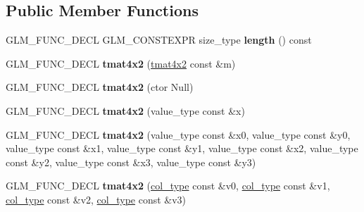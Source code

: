 \subsection*{Public Member Functions}
\begin{DoxyCompactItemize}
\item 
\hypertarget{structglm_1_1detail_1_1tmat4x2_a36f50e76c1c508ca17176aea229ca2e6}{}G\+L\+M\+\_\+\+F\+U\+N\+C\+\_\+\+D\+E\+C\+L G\+L\+M\+\_\+\+C\+O\+N\+S\+T\+E\+X\+P\+R size\+\_\+type {\bfseries length} () const \label{structglm_1_1detail_1_1tmat4x2_a36f50e76c1c508ca17176aea229ca2e6}

\item 
\hypertarget{structglm_1_1detail_1_1tmat4x2_a21673f91cd632a43d412702336f2b982}{}G\+L\+M\+\_\+\+F\+U\+N\+C\+\_\+\+D\+E\+C\+L {\bfseries tmat4x2} (\hyperlink{structglm_1_1detail_1_1tmat4x2}{tmat4x2} const \&m)\label{structglm_1_1detail_1_1tmat4x2_a21673f91cd632a43d412702336f2b982}

\item 
\hypertarget{structglm_1_1detail_1_1tmat4x2_a66c897d620eda8ceed552aecd16dde84}{}G\+L\+M\+\_\+\+F\+U\+N\+C\+\_\+\+D\+E\+C\+L {\bfseries tmat4x2} (ctor Null)\label{structglm_1_1detail_1_1tmat4x2_a66c897d620eda8ceed552aecd16dde84}

\item 
\hypertarget{structglm_1_1detail_1_1tmat4x2_afc3d841b8ed8a9071021990b418de881}{}G\+L\+M\+\_\+\+F\+U\+N\+C\+\_\+\+D\+E\+C\+L {\bfseries tmat4x2} (value\+\_\+type const \&x)\label{structglm_1_1detail_1_1tmat4x2_afc3d841b8ed8a9071021990b418de881}

\item 
\hypertarget{structglm_1_1detail_1_1tmat4x2_ae052381f88eadec6c0a28c42dba21871}{}G\+L\+M\+\_\+\+F\+U\+N\+C\+\_\+\+D\+E\+C\+L {\bfseries tmat4x2} (value\+\_\+type const \&x0, value\+\_\+type const \&y0, value\+\_\+type const \&x1, value\+\_\+type const \&y1, value\+\_\+type const \&x2, value\+\_\+type const \&y2, value\+\_\+type const \&x3, value\+\_\+type const \&y3)\label{structglm_1_1detail_1_1tmat4x2_ae052381f88eadec6c0a28c42dba21871}

\item 
\hypertarget{structglm_1_1detail_1_1tmat4x2_a31d767bc971c9378a1deff8f62dd6575}{}G\+L\+M\+\_\+\+F\+U\+N\+C\+\_\+\+D\+E\+C\+L {\bfseries tmat4x2} (\hyperlink{structglm_1_1detail_1_1tvec2}{col\+\_\+type} const \&v0, \hyperlink{structglm_1_1detail_1_1tvec2}{col\+\_\+type} const \&v1, \hyperlink{structglm_1_1detail_1_1tvec2}{col\+\_\+type} const \&v2, \hyperlink{structglm_1_1detail_1_1tvec2}{col\+\_\+type} const \&v3)\label{structglm_1_1detail_1_1tmat4x2_a31d767bc971c9378a1deff8f62dd6575}


\end{DoxyCompactItemize}
